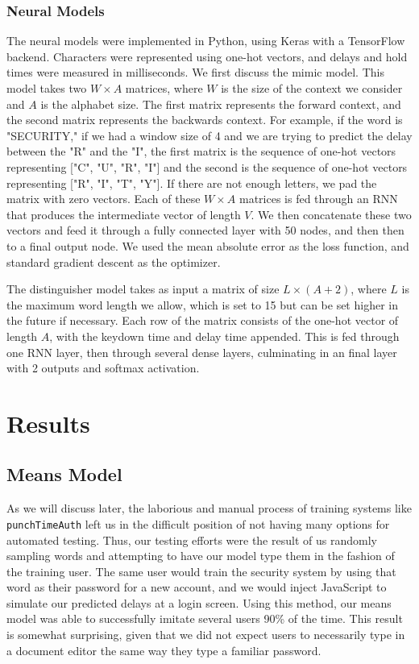 \documentclass{amsart}
\begin{document}
\begin{multicols*}{2}
\subsubsection{Neural Models}
The neural models were implemented in Python, using Keras with a TensorFlow backend. Characters were represented using one-hot vectors, and delays and hold times were measured in milliseconds. We first discuss the mimic model. This model takes two $W \times A$ matrices, where $W$ is the size of the context we consider and $A$ is the alphabet size. The first matrix represents the forward context, and the second matrix represents the backwards context. For example, if the word is "SECURITY," if we had a window size of 4 and we are trying to predict the delay between the "R" and the "I", the first matrix is the sequence of one-hot vectors representing ["C", "U", "R", "I"] and the second is the sequence of one-hot vectors representing ["R", "I", "T", "Y"]. If there are not enough letters, we pad the matrix with zero vectors. Each of these $W \times A$ matrices is fed through an RNN that produces the intermediate vector of length $V$. We then concatenate these two vectors and feed it through a fully connected layer with 50 nodes, and then then to a final output node. We used the mean absolute error as the loss function, and standard gradient descent as the optimizer.

The distinguisher model takes as input a matrix of size $L \times (A + 2)$, where $L$ is the maximum word length we allow, which is set to 15 but can be set higher in the future if necessary. Each row of the matrix consists of the one-hot vector of length $A$, with the keydown time and delay time appended. This is fed through one RNN layer, then through several dense layers, culminating in an final layer with 2 outputs and softmax activation.

\section{Results}
\subsection{Means Model}

As we will discuss later, the laborious and manual process of training systems like \texttt{punchTimeAuth} left us in the difficult position of not having many options for automated testing. Thus, our testing efforts were the result of us randomly sampling words and attempting to have our model type them in the fashion of the training user. The same user would train the security system by using that word as their password for a new account, and we would inject JavaScript to simulate our predicted delays at a login screen. Using this method, our means model was able to successfully imitate several users 90\% of the time. This result is somewhat surprising, given that we did not expect users to necessarily type in a document editor the same way they type a familiar password.


\end{multicols*}
\end{document}
